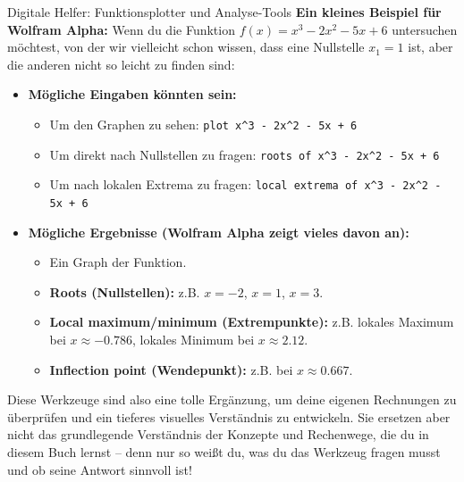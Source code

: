 \begin{infoboxumgebung}{Digitale Helfer: Funktionsplotter und Analyse-Tools}
\textbf{Ein kleines Beispiel für Wolfram Alpha:}
Wenn du die Funktion $f(x) = x^3 - 2x^2 - 5x + 6$ untersuchen möchtest, von der wir vielleicht schon wissen, dass eine Nullstelle $x_1=1$ ist, aber die anderen nicht so leicht zu finden sind:
\begin{itemize}
    \item \textbf{Mögliche Eingaben könnten sein:}
        \begin{itemize}
            \item Um den Graphen zu sehen: \verb|plot x^3 - 2x^2 - 5x + 6|
            \item Um direkt nach Nullstellen zu fragen: \verb|roots of x^3 - 2x^2 - 5x + 6|
            \item Um nach lokalen Extrema zu fragen: \verb|local extrema of x^3 - 2x^2 - 5x + 6|
        \end{itemize}
    \item \textbf{Mögliche Ergebnisse (Wolfram Alpha zeigt vieles davon an):}
    \begin{itemize}
        \item Ein Graph der Funktion.
        \item \textbf{Roots (Nullstellen):} z.B. $x=-2$, $x=1$, $x=3$.
        \item \textbf{Local maximum/minimum (Extrempunkte):} z.B. lokales Maximum bei $x \approx -0.786$, lokales Minimum bei $x \approx 2.12$.
        \item \textbf{Inflection point (Wendepunkt):} z.B. bei $x \approx 0.667$.
    \end{itemize}
\end{itemize}
Diese Werkzeuge sind also eine tolle Ergänzung, um deine eigenen Rechnungen zu überprüfen und ein tieferes visuelles Verständnis zu entwickeln. Sie ersetzen aber nicht das grundlegende Verständnis der Konzepte und Rechenwege, die du in diesem Buch lernst – denn nur so weißt du, was du das Werkzeug fragen musst und ob seine Antwort sinnvoll ist!
\end{infoboxumgebung}


